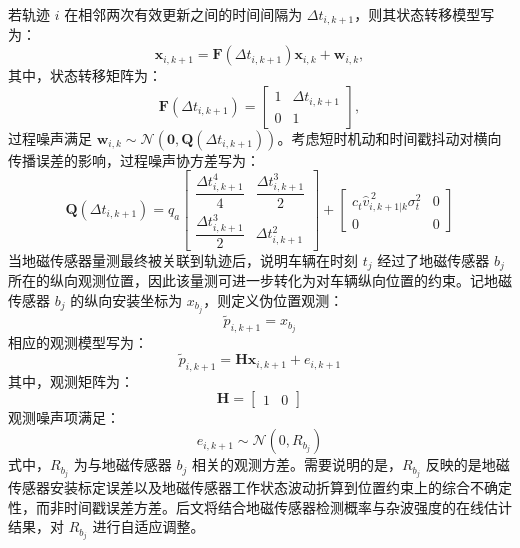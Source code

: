 \documentclass{xdupgthesis}
\begin{document}
若轨迹 $i$ 在相邻两次有效更新之间的时间间隔为 $\Delta t_{i,k+1}$，则其状态转移模型写为：
\begin{equation}
	\mathbf x_{i,k+1}=
	\mathbf F\left(\Delta t_{i,k+1}\right)\mathbf x_{i,k}+\mathbf w_{i,k},
	\label{eq:ch3_state_transition}
\end{equation}
其中，状态转移矩阵为：
\begin{equation}
	\mathbf F\left(\Delta t_{i,k+1}\right)=
	\begin{bmatrix}
		1 & \Delta t_{i,k+1}\\
		0 & 1
	\end{bmatrix},
	\label{eq:ch3_F}
\end{equation}
过程噪声满足 $\mathbf w_{i,k}\sim\mathcal N(\mathbf 0,\mathbf Q(\Delta t_{i,k+1}))$。考虑短时机动和时间戳抖动对横向传播误差的影响，过程噪声协方差写为：
\begin{equation}
	\mathbf Q\left(\Delta t_{i,k+1}\right)
	=
	q_a
	\begin{bmatrix}
		\dfrac{\Delta t_{i,k+1}^{4}}{4} & \dfrac{\Delta t_{i,k+1}^{3}}{2}\\[6pt]
		\dfrac{\Delta t_{i,k+1}^{3}}{2} & \Delta t_{i,k+1}^{2}
	\end{bmatrix}
	+
	\begin{bmatrix}
		c_t \hat v_{i,k+1|k}^{\,2}\sigma_t^2 & 0\\
		0 & 0
	\end{bmatrix}
	\label{eq:ch3_Q}
\end{equation}
当地磁传感器量测最终被关联到轨迹后，说明车辆在时刻 $t_j$ 经过了地磁传感器 $b_j$ 所在的纵向观测位置，因此该量测可进一步转化为对车辆纵向位置的约束。记地磁传感器 $b_j$ 的纵向安装坐标为 $x_{b_j}$，则定义伪位置观测：
\begin{equation}
	\tilde p_{i,k+1}=x_{b_j}
	\label{eq:ch3_pseudo_meas}
\end{equation}
相应的观测模型写为：
\begin{equation}
	\tilde p_{i,k+1}=\mathbf H\mathbf x_{i,k+1}+e_{i,k+1}
\end{equation}
其中，观测矩阵为：
\begin{equation}
	\mathbf H=
	\begin{bmatrix}
		1 & 0
	\end{bmatrix}
\end{equation}
观测噪声项满足：
\begin{equation}
	e_{i,k+1}\sim\mathcal N(0,R_{b_j})
	\label{eq:ch3_measurement_k}
\end{equation}
式中，$R_{b_j}$ 为与地磁传感器 $b_j$ 相关的观测方差。需要说明的是，$R_{b_j}$ 反映的是地磁传感器安装标定误差以及地磁传感器工作状态波动折算到位置约束上的综合不确定性，而非时间戳误差方差。后文将结合地磁传感器检测概率与杂波强度的在线估计结果，对 $R_{b_j}$ 进行自适应调整。
\end{document}
